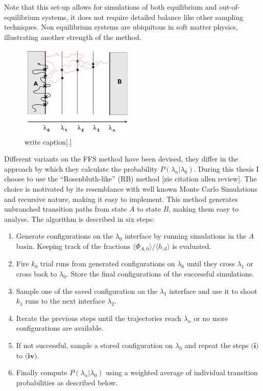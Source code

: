 Note that this set-up allows for simulations of both equilibrium and out-of-equilibrium
systems, it does not require detailed balance like other sampling techniques. Non
equilibrium systems are ubiquitous in soft matter physics, illustrating another strength
of the method.
\begin{figure}[ht]
\begin{center}
  \includegraphics[width=0.5\textwidth]{Figures/FFS.png}
  \caption{write caption[.]}
\end{center}
\end{figure}
Different variants on the FFS method have been devised, they differ in the approach by
which they calculate the probability $P(\lambda_n|\lambda_0)$. During this thesis I
choose to use the “Rosenbluth-like” (RB) method [zie citation allen review]. The choice
is motivated
by its resemblance with well known Monte Carlo Simulations and recursive nature, making
it easy to implement.  This method generates unbranched transition paths from state $A$
to state $B$, making them easy to analyse. The algorithm is described in six steps:
\begin{enumerate}[label=(\roman*)]
   \item Generate configurations on the $\lambda_0$ interface by running
      simulations in the $A$ basin. Keeping track of the fractions $\langle
      \Phi_{A,0} \rangle/\langle h_{\mathcal{A}}\rangle$ is evaluated.
   \item Fire $k_0$ trial runs from generated configurations on $\lambda_0$ until they
      cross $\lambda_1$ or cross back to $\lambda_0$. Store the final configurations of
      the successful simulations.
   \item Sample one of the saved configuration on the $\lambda_1$ interface and use it to
      shoot $k_1$ runs to the next interface $\lambda_2$.
   \item Iterate the previous steps until the trajectories reach $\lambda_n$ or no more
     configurations are available.
   \item If not successful, sample a stored configuration on $\lambda_0$ and repeat the
      steps $\textbf{(i)}$ to $\textbf{(iv)}$.
   \item Finally compute $P(\lambda_n|\lambda_0)$ using a weighted average of individual
     transition probabilities as described below.
\end{enumerate}
